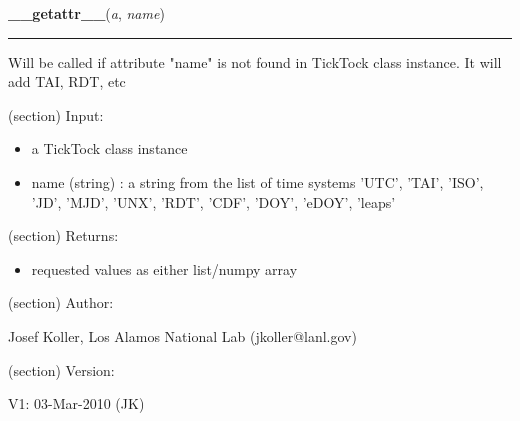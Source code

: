 \hspace{.8\funcindent}\begin{boxedminipage}{\funcwidth}

    \raggedright \textbf{\_\_getattr\_\_}(\textit{a}, \textit{name})

    \vspace{-1.5ex}

    \rule{\textwidth}{0.5\fboxrule}
\setlength{\parskip}{2ex}
    Will be called if attribute "name" is not found in TickTock class 
    instance. It will add TAI, RDT, etc

    (section) Input:

      \begin{itemize}
      \setlength{\parskip}{0.6ex}
        \item a TickTock class instance

        \item name (string) : a string from the list of time systems 'UTC', 
          'TAI', 'ISO', 'JD', 'MJD', 'UNX', 'RDT', 'CDF', 'DOY', 'eDOY', 
          'leaps'

      \end{itemize}

    (section) Returns:

      \begin{itemize}
      \setlength{\parskip}{0.6ex}
        \item requested values as either list/numpy array

      \end{itemize}

    (section) Author:

      Josef Koller, Los Alamos National Lab (jkoller@lanl.gov)

    (section) Version:

      V1: 03-Mar-2010 (JK)

\setlength{\parskip}{1ex}
    \end{boxedminipage}

    \label{spacepy:spacetime:TickTock:update_items}

    \vspace{0.5ex}

